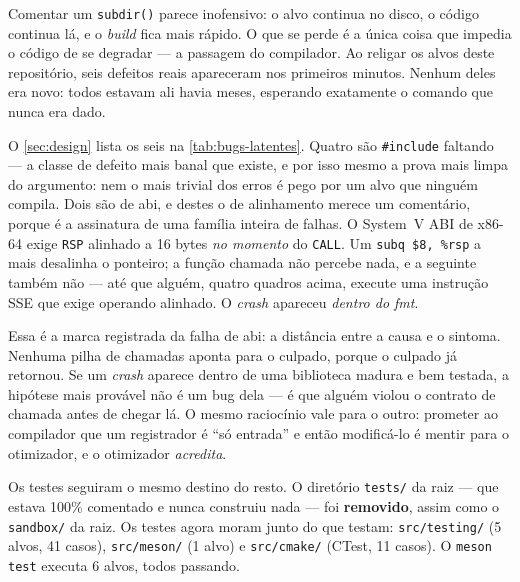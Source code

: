 \begin{porque}
Comentar um \texttt{subdir()} parece inofensivo: o alvo continua no disco, o
código continua lá, e o \emph{build} fica mais rápido. O que se perde é a
única coisa que impedia o código de se degradar --- a passagem do compilador.
Ao religar os alvos deste repositório, seis defeitos reais apareceram nos
primeiros minutos. Nenhum deles era novo: todos estavam ali havia meses,
esperando exatamente o comando que nunca era dado.
\end{porque}

O \cref{sec:design} lista os seis na \cref{tab:bugs-latentes}. Quatro são
\texttt{\#include} faltando --- a classe de defeito mais banal que existe, e por
isso mesmo a prova mais limpa do argumento: nem o mais trivial dos erros é pego
por um alvo que ninguém compila. Dois são de \gls{abi}, e destes o de
alinhamento merece um comentário, porque é a assinatura de uma família inteira
de falhas. O System~V ABI de x86-64 exige \texttt{RSP} alinhado a 16 bytes
\emph{no momento} do \texttt{CALL}. Um \texttt{subq \$8, \%rsp} a mais desalinha
o ponteiro; a função chamada não percebe nada, e a seguinte também não --- até
que alguém, quatro quadros acima, execute uma instrução SSE que exige operando
alinhado. O \emph{crash} apareceu \emph{dentro do fmt}.

\begin{armadilha}
Essa é a marca registrada da falha de \gls{abi}: a distância entre a causa e o
sintoma. Nenhuma pilha de chamadas aponta para o culpado, porque o culpado já
retornou. Se um \emph{crash} aparece dentro de uma biblioteca madura e bem
testada, a hipótese mais provável não é um bug dela --- é que alguém violou o
contrato de chamada antes de chegar lá. O mesmo raciocínio vale para o outro:
prometer ao compilador que um registrador é ``só entrada'' e então modificá-lo
é mentir para o otimizador, e o otimizador \emph{acredita}.
\end{armadilha}

Os testes seguiram o mesmo destino do resto. O diretório \texttt{tests/} da
raiz --- que estava 100\% comentado e nunca construiu nada --- foi
\textbf{removido}, assim como o \texttt{sandbox/} da raiz. Os testes agora
moram junto do que testam: \texttt{src/testing/} (5 alvos, 41 casos),
\texttt{src/meson/} (1 alvo) e \texttt{src/cmake/} (CTest, 11 casos). O
\texttt{meson test} executa 6 alvos, todos passando.

